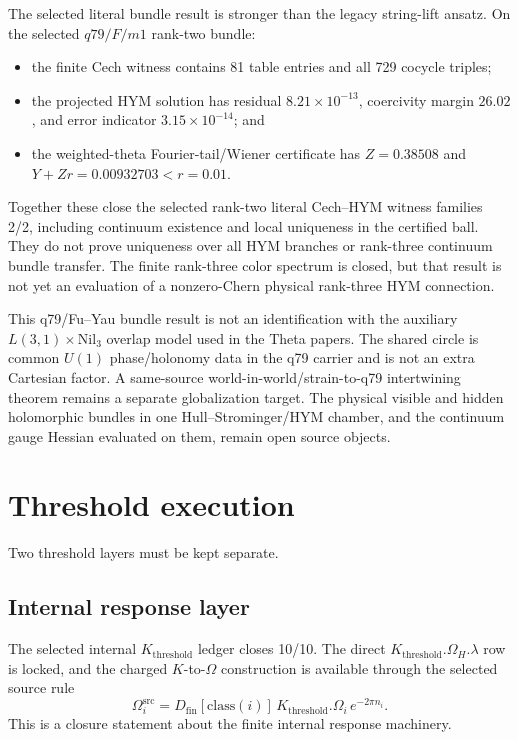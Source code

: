 \documentclass[11pt]{article}
\begin{document}
The selected literal bundle result is stronger than the legacy string-lift
ansatz. On the selected $q79/F/m1$ rank-two bundle:
\begin{itemize}
\item the finite Cech witness contains 81 table entries and all 729 cocycle
triples;
\item the projected HYM solution has residual $8.21\times10^{-13}$,
coercivity margin $26.02$, and error indicator $3.15\times10^{-14}$; and
\item the weighted-theta Fourier-tail/Wiener certificate has
$Z=0.38508$ and $Y+Zr=0.00932703<r=0.01$.
\end{itemize}
Together these close the selected rank-two literal Cech--HYM witness families
2/2, including continuum existence and local uniqueness in the certified
ball. They do not prove uniqueness over all HYM branches or rank-three
continuum bundle transfer. The finite rank-three color spectrum is closed, but
that result is not yet an evaluation of a nonzero-Chern physical rank-three
HYM connection.

This q79/Fu--Yau bundle result is not an identification with the auxiliary
$L(3,1)\times\mathrm{Nil}_3$ overlap model used in the Theta papers. The shared
circle is common $U(1)$ phase/holonomy data in the q79 carrier and is not an
extra Cartesian factor. A same-source world-in-world/strain-to-q79
intertwining theorem remains a separate globalization target. The physical
visible and hidden holomorphic bundles in one Hull--Strominger/HYM chamber,
and the continuum gauge Hessian evaluated on them, remain open source objects.

\section{Threshold execution}

Two threshold layers must be kept separate.

\subsection{Internal response layer}

The selected internal $K_{\mathrm{threshold}}$ ledger closes 10/10. The direct
$K_{\mathrm{threshold}}.\Omega_H.\lambda$ row is locked, and the charged
$K$-to-$\Omega$ construction is available through the selected source rule
\[
\Omega_i^{\mathrm{src}}
=D_{\mathrm{fin}}[\mathrm{class}(i)]\,
K_{\mathrm{threshold}}.\Omega_i\,e^{-2\pi n_i}.
\]
This is a closure statement about the finite internal response machinery.
\end{document}
